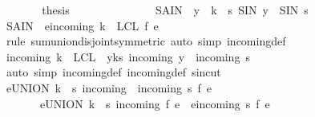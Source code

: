 \begin{isabellebody}
\ \ \ \ \isamarkupfalse%
\ \isamarkupfalse%
\ {\isacharquery}thesis\ \isacommand{{\isachardot}}\isamarkupfalse%
\isanewline
\ \ \isamarkupfalse%
\ \ \ \ \ \isanewline
\ \ \isamarkupfalse%
\ \isamarkupfalse%
\ {\isachardoublequoteopen}{\isacharquery}SAIN\ {\isacharequal}\ {\isacharparenleft}{\isasymSum}y\ {\isasymin}\ k\ {\isacharminus}\ {\isacharbraceleft}s{\isacharbraceright}{\isachardot}\ {\isacharquery}SIN\ y{\isacharparenright}\ {\isacharplus}\ {\isacharquery}SIN\ s{\isachardoublequoteclose}\isanewline
\ \ \isamarkupfalse%
\ {\isacharminus}\isanewline
\ \ \ \ \isamarkupfalse%
\ {\isachardoublequoteopen}{\isacharquery}SAIN\ {\isacharequal}\ {\isacharparenleft}{\isasymSum}e{\isasymin}{\isacharparenleft}incoming{\isacharprime}\ k\ {\isasymunion}\ {\isacharquery}LCL{\isacharparenright}{\isachardot}\ f\ e{\isacharparenright}{\isachardoublequoteclose}\isanewline
\ \ \ \ \ \ \isamarkupfalse%
\ {\isacharparenleft}rule\ sum{\isachardot}union{\isacharunderscore}disjoint{\isacharbrackleft}symmetric{\isacharbrackright}{\isacharparenright}\ {\isacharparenleft}auto\ simp{\isacharcolon}\ incoming{\isacharprime}{\isacharunderscore}def{\isacharparenright}\isanewline
\ \ \ \ \isamarkupfalse%
\ \isamarkupfalse%
\ {\isachardoublequoteopen}incoming{\isacharprime}\ k\ {\isasymunion}\ {\isacharquery}LCL\ {\isacharequal}\ {\isacharparenleft}{\isasymUnion}y{\isasymin}k{\isacharminus}{\isacharbraceleft}s{\isacharbraceright}{\isachardot}\ incoming\ y{\isacharparenright}\ {\isasymunion}\ incoming\ s{\isachardoublequoteclose}\isanewline
\ \ \ \ \ \ \isamarkupfalse%
\ {\isacharparenleft}auto\ simp{\isacharcolon}\ incoming{\isacharunderscore}def\ incoming{\isacharprime}{\isacharunderscore}def\ s{\isacharunderscore}in{\isacharunderscore}cut{\isacharparenright}\isanewline
\ \ \ \ \isamarkupfalse%
\ \isamarkupfalse%
\ {\isachardoublequoteopen}{\isacharparenleft}{\isasymSum}e{\isasymin}{\isacharparenleft}UNION\ {\isacharparenleft}k\ {\isacharminus}\ {\isacharbraceleft}s{\isacharbraceright}{\isacharparenright}\ incoming\ {\isasymunion}\ incoming\ s{\isacharparenright}{\isachardot}\ f\ e{\isacharparenright}\ \isanewline
\ \ \ \ \ \ {\isacharequal}\ {\isacharparenleft}{\isasymSum}e{\isasymin}{\isacharparenleft}UNION\ {\isacharparenleft}k\ {\isacharminus}\ {\isacharbraceleft}s{\isacharbraceright}{\isacharparenright}\ incoming{\isacharparenright}{\isachardot}\ f\ e{\isacharparenright}\ {\isacharplus}\ {\isacharparenleft}{\isasymSum}e{\isasymin}incoming\ s{\isachardot}\ f\ e{\isacharparenright}{\isachardoublequoteclose}\ \ \isanewline

\end{isabellebody}
